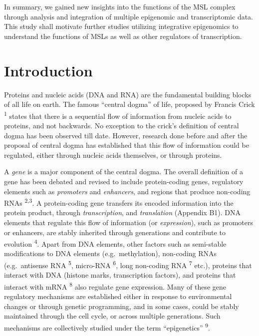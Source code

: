 \documentclass[11pt,twoside]{MPIthesis}
\theoremstyle{definition}
\theoremstyle{definition}
\theoremstyle{definition}
\theoremstyle{remark}
\begin{document}
In summary, we gained new insights into the functions of the MSL complex
through analysis and integration of multiple epigenomic and
transcriptomic data. This study shall motivate further studies utilizing
integrative epigenomics to understand the functions of MSLs as well as
other regulators of transcription.


\chapter{Introduction}\label{introduction}

Proteins and nucleic acids (DNA and RNA) are the fundamental building
blocks of all life on earth. The famous ``central dogma'' of life,
proposed by Francis Crick \textsuperscript{1} states that there is a
sequential flow of information from nucleic acids to proteins, and not
backwards. No exception to the crick's definition of central dogma has
been observed till date. However, research done before and after the
proposal of central dogma has established that this flow of information
could be regulated, either through nucleic acids themselves, or through
proteins.

A \emph{gene} is a major component of the central dogma. The overall
definition of a gene has been debated and revised to include
protein-coding genes, regulatory elements such as \emph{promoters} and
\emph{enhancers}, and regions that produce non-coding RNAs
\textsuperscript{2,3}. A protein-coding gene transfers its encoded
information into the protein product, through \emph{transcription}, and
\emph{translation} (Appendix B1). DNA elements that regulate this flow
of information (or \emph{expression}), such as promoters or enhancers,
are stably inherited through generations and contribute to evolution
\textsuperscript{4}. Apart from DNA elements, other factors such as
semi-stable modifications to DNA elements (e.g.~methylation), non-coding
RNAs (e.g.~antisense RNA \textsuperscript{5}, micro-RNA
\textsuperscript{6}, long non-coding RNA \textsuperscript{7} etc.),
proteins that interact with DNA (histone marks, transcription factors),
and proteins that interact with mRNA \textsuperscript{8} also regulate
gene expression. Many of these gene regulatory mechanisms are
established either in response to environmental changes or through
genetic programming, and in some cases, could be stably maintained
through the cell cycle, or across multiple generations. Such mechanisms
are collectively studied under the term ``epigenetics''
\textsuperscript{9}.
\end{document}

